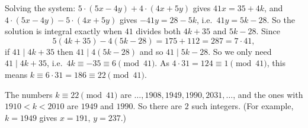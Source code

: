 Solving the system: $5\cdot(5x-4y)+4\cdot(4x+5y)$ gives $41x=35+4k$, and $4\cdot(5x-4y)-5\cdot(4x+5y)$ gives $-41y=28-5k$, i.e.\ $41y=5k-28$. So the solution is integral exactly when $41$ divides both $4k+35$ and $5k-28$. Since
\[
5(4k+35)-4(5k-28)=175+112=287=7\cdot41,
\]
if $41\mid4k+35$ then $41\mid4(5k-28)$ and so $41\mid5k-28$. So we only need $41\mid4k+35$, i.e.\ $4k\equiv-35\equiv6\pmod{41}$. As $4\cdot31=124\equiv1\pmod{41}$, this means $k\equiv6\cdot31=186\equiv22\pmod{41}$.

The numbers $k\equiv22\pmod{41}$ are $\dots,1908,1949,1990,2031,\dots$, and the ones with $1910<k<2010$ are $1949$ and $1990$. So there are $\boxed{2}$ such integers. (For example, $k=1949$ gives $x=191$, $y=237$.)
